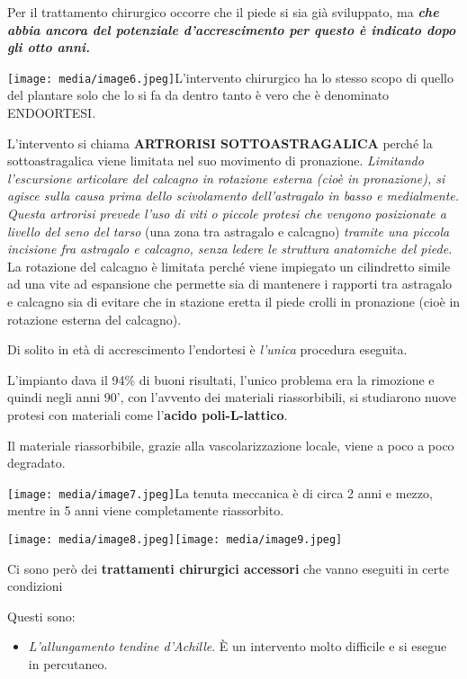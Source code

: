 \documentclass[]{article}
\begin{document}
Per il trattamento chirurgico occorre che il piede si sia già
sviluppato, ma \textbf{\emph{che abbia ancora del potenziale
d'accrescimento per questo è indicato dopo gli otto anni.}}

\texttt{[image: media/image6.jpeg]}L'intervento
chirurgico ha lo stesso scopo di quello del plantare solo che lo si fa
da dentro tanto è vero che è denominato ENDOORTESI.

L'intervento si chiama \textbf{ARTRORISI SOTTOASTRAGALICA} perché la
sottoastragalica viene limitata nel suo movimento di pronazione.
\emph{Limitando l'escursione articolare del calcagno in rotazione
esterna (cioè in pronazione), si agisce sulla causa prima dello
scivolamento dell'astragalo in basso e medialmente.} \emph{Questa
artrorisi prevede l'uso di viti o piccole protesi che vengono
posizionate a livello del seno del tarso} (una zona tra astragalo e
calcagno) \emph{tramite una piccola incisione fra astragalo e calcagno,
senza ledere le struttura anatomiche del piede.} La rotazione del
calcagno è limitata perché viene impiegato un cilindretto simile ad una
vite ad espansione che permette sia di mantenere i rapporti tra
astragalo e calcagno sia di evitare che in stazione eretta il piede
crolli in pronazione (cioè in rotazione esterna del calcagno).

Di solito in età di accrescimento l'endortesi è \emph{l'unica} procedura
eseguita.

L'impianto dava il 94\% di buoni risultati, l'unico problema era la
rimozione e quindi negli anni 90', con l'avvento dei materiali
riassorbibili, si studiarono nuove protesi con materiali come
l'\textbf{acido poli-L-lattico}.

Il materiale riassorbibile, grazie alla vascolarizzazione locale, viene
a poco a poco degradato.

\texttt{[image: media/image7.jpeg]}La
tenuta meccanica è di circa 2 anni e mezzo, mentre in 5 anni viene
completamente riassorbito.

\texttt{[image: media/image8.jpeg]}\texttt{[image: media/image9.jpeg]}

Ci sono però dei \textbf{trattamenti chirurgici accessori} che vanno
eseguiti in certe condizioni

Questi sono:

\begin{itemize}
\item
  \emph{L'allungamento tendine d'Achille}. È un intervento molto
  difficile e si esegue in percutaneo.
\end{itemize}
\end{document}
